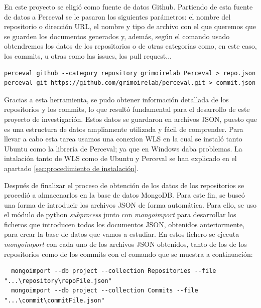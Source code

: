 \documentclass[a4paper, 12pt]{book}
\begin{document}
En este proyecto se eligió como fuente de datos Github. 
Partiendo de esta fuente de datos a Perceval se le pasaron los siguientes parámetros: el nombre del repositorio o dirección URL, el nombre y tipo de archivo con el que queremos que se guarden los documentos generados y, además, según el comando usado obtendremos los datos de los repositorios o de otras categorías como, en este caso, los commits, u otras como las issues, los pull request...
\begin{verbatim}
perceval github --category repository grimoirelab Perceval > repo.json
perceval git https://github.com/grimoirelab/perceval.git > commit.json
\end{verbatim} 
    

Gracias a esta herramienta, se pudo obtener información detallada de los repositorios y los commits, lo que resultó fundamental para el desarrollo de este proyecto de investigación.
Estos datos se guardaron en archivos JSON, puesto que es una estructura de datos ampliamente utilizada y fácil de comprender.
Para llevar a cabo esta tarea usamos una conexion WLS en la cual se instaló tanto Ubuntu como la librería de Perceval; ya que en Windows daba problemas.
La intalación tanto de WLS como de Ubuntu y Perceval se han explicado en el apartado \ref{sec:procedimiento de instalación}.

Después de finalizar el proceso de obtención de los datos de los repositorios se procedió a almacenarlos en la base de datos MongoDB.
Para este fin, se buscó una forma de introducir los archivos JSON de forma automática. 
Para ello, se uso el módulo de python \emph{subprocess} junto con \emph{mongoimport} para desarrollar los ficheros que introducen todos los documentos JSON, obtenidos anteriormente, para crear la base de datos que vamos a estudiar.
En estos fichero se ejecuta \emph{mongoimport} con cada uno de los archivos JSON obtenidos, tanto de los de los repositorios como de los commits con el comando que se muestra a continuación:
\begin{verbatim}
  mongoimport --db project --collection Repositories --file "...\repository\repoFile.json"
  mongoimport --db project --collection Commits --file "...\commit\commitFile.json"
\end{verbatim}
\end{document}
